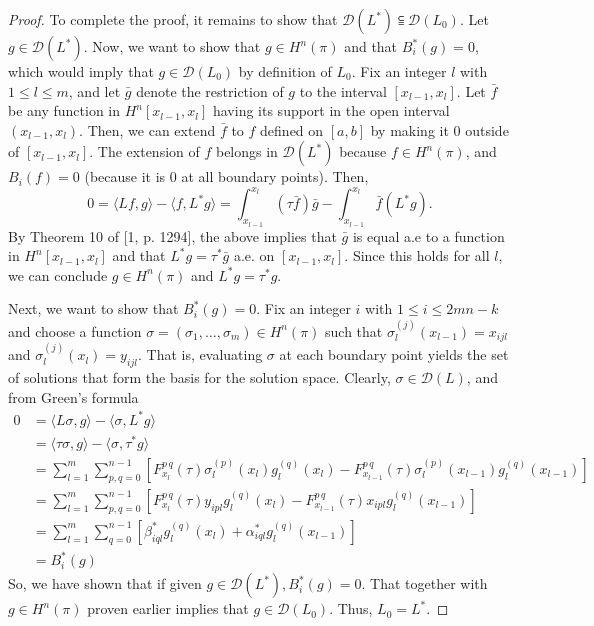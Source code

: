 \documentclass[11pt,reqno,oneside,a4paper]{article}
\begin{document}
\begin{proof}
		To complete the proof, it remains to show that $\mathcal{D}(L^*) \subseteqq \mathcal{D}(L_0)$. Let $g \in \mathcal{D}(L^*)$. Now, we want to show that $g \in H^n(\pi)$ and that $B_i^*(g) = 0$, which would imply that $g \in \mathcal{D}(L_0)$ by definition of $L_0$. Fix an integer $l$ with $1 \leq l \leq m$, and let $\bar{g}$ denote the restriction of $g$ to the interval $[x_{l-1}, x_l].$ Let $\bar{f}$ be any function in $H^n[x_{l-1},x_l]$ having its support in the open interval $(x_{l-1},x_l)$. 
		Then, we can extend $\bar{f}$ to $f$ defined on $[a,b]$ by making it 0 outside of $[x_{l-1},x_l]$. The extension of $f$ belongs in $\mathcal{D}(L^*)$ because $f \in H^n(\pi)$, and $B_i(f) = 0$ (because it is 0 at all boundary points). Then,
		$$ 0 = \langle Lf,g\rangle - \langle f, L^*g\rangle = \int_{x_{l-1}}^{x_l}(\tau\bar{f})\bar{g} - \int_{x_{l-1}}^{x_l}\bar{f}(L^*g).$$
		By Theorem 10 of [1, p. 1294], the above implies that $\bar{g}$ is equal a.e to a function in $H^n[x_{l-1},x_l]$ and that $L^*g = \tau^*\bar{g}$ a.e. on $[x_{l-1},x_l]$. Since this holds for all $l$, we can conclude $g\in H^n(\pi)$ and $L^*g=\tau^*g$. 
		
		Next, we want to show that $B_i^*(g) = 0$. Fix an integer $i$ with $1\leq i \leq 2mn-k$ and choose a function $\sigma = (\sigma_1,\dots, \sigma_m) \in H^n(\pi)$ such that $\sigma_l^{(j)}(x_{l-1}) = x_{ijl}$ and $\sigma_l^{(j)}(x_{l}) = y_{ijl}$. That is, evaluating $\sigma$ at each boundary point yields the set of solutions that form the basis for the solution space. Clearly, $\sigma \in \mathcal{D}(L)$, and from Green's formula
		\begin{align*}
		     0 &= \langle L\sigma,g\rangle - \langle \sigma, L^*g\rangle\\
		     &= \langle \tau\sigma,g\rangle - \langle \sigma, \tau^*g\rangle\\
		     &= \sum_{l=1}^{m}\sum_{p,q=0}^{n-1}[F_{x_l}^{p\,q}(\tau)\sigma_l^{(p)}(x_l)g_l^{(q)}(x_l)
		     - F_{x_{l-1}}^{p\,q}(\tau)\sigma_l^{(p)}(x_{l-1})g_l^{(q)}(x_{l-1})]\\
		     &= \sum_{l=1}^{m}\sum_{p,q=0}^{n-1}[F_{x_l}^{p\,q}(\tau)y_{ipl}g_l^{(q)}(x_l)
		     - F_{x_{l-1}}^{p\,q}(\tau)x_{ipl}g_l^{(q)}(x_{l-1})]\\
		     &= \sum_{l=1}^{m}\sum_{q=0}^{n-1}[\beta_{iql}^*g_l^{(q)}(x_l) + \alpha_{iql}^*g_l^{(q)}(x_{l-1})]\\
		     &= B_i^*(g) 
		\end{align*}
		So, we have shown that if given $g \in \mathcal{D}(L^*), B_i^*(g) = 0$. That together with $g \in H^n(\pi)$ proven earlier implies that $g \in \mathcal{D}(L_0)$. Thus, $L_0 = L^*$.
	\end{proof}
\end{document}
